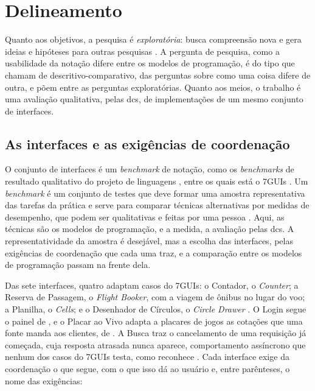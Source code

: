 \section{Delineamento}
\label{sec:delineamento}

Quanto aos objetivos, a pesquisa é \emph{exploratória}: busca compreensão nova
e gera ideias e hipóteses para outras pesquisas
\cite[p. 135]{runeson2009}.
A pergunta de pesquisa, como a usabilidade da notação difere entre os modelos de
programação, é do tipo que \textcite{easterbrook2008} chamam de
descritivo-comparativo, das perguntas sobre como uma coisa difere de outra,
e põem entre as perguntas exploratórias.
Quanto aos meios, o trabalho é uma avaliação qualitativa, pelas
\glspl{dc}, de implementações de um mesmo conjunto de interfaces.
\subsection{As interfaces e as exigências de coordenação}
\label{sec:as-interfaces-e-as-exigencias-de-coordenacao}

O conjunto de interfaces é um \emph{benchmark} de notação, como os \emph{benchmarks}
de resultado qualitativo do projeto de linguagens
\cite[p. 35]{erdweg2015}, entre os quais está o 7GUIs
\cite[p. 8:20]{lu2021}.
Um \emph{benchmark} é um conjunto de testes que deve formar uma amostra
representativa das tarefas da prática e serve para comparar técnicas
alternativas por medidas de desempenho, que podem ser qualitativas e
feitas por uma pessoa \cite[p. 76]{sim2003}.
Aqui, as técnicas são os modelos de programação, e a medida, a avaliação
pelas \glspl{dc}.
A representatividade da amostra é desejável, mas a escolha das
interfaces, pelas exigências de coordenação que cada uma traz, e a
comparação entre os modelos de programação passam na frente dela.

Das sete interfaces, quatro adaptam casos do 7GUIs: o Contador, o
\emph{Counter}; a Reserva de Passagem, o \emph{Flight Booker}, com a viagem de
ônibus no lugar do voo; a Planilha, o \emph{Cells}; e o Desenhador de
Círculos, o \emph{Circle Drawer} \cite[p. 17, 25, 40 e 49]{kiss2014}.
O Login segue o painel de \textcite[p. 534]{berry2020}, e o Placar ao
Vivo adapta a placares de jogos as cotações que uma fonte manda aos
clientes, de \textcite[p. 66]{meijer2012}.
A Busca traz o cancelamento de uma requisição já começada, cuja
resposta atrasada nunca aparece, comportamento assíncrono que nenhum
dos casos do 7GUIs testa, como reconhece \textcite[p. 77]{kiss2014}.
Cada interface exige da coordenação o que segue, com o que isso dá ao
usuário e, entre parênteses, o nome das exigências:

